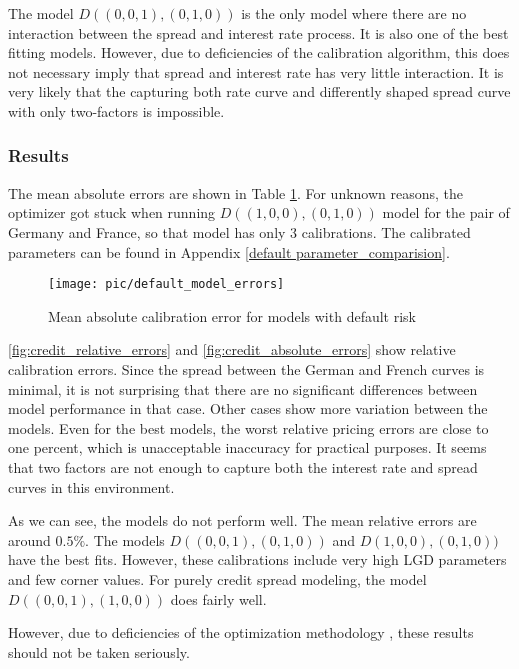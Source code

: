 The model $D((0, 0, 1), (0,1,0))$ is the only model where there are no interaction between the spread and interest rate process. It is also one of the best fitting models. However, due to deficiencies of the calibration algorithm, this does not necessary imply that spread and interest rate has very little interaction. It is very likely that the capturing both rate curve and differently shaped spread curve with only two-factors is impossible.

\subsubsection{Results}

The mean absolute errors are shown in Table \ref{fig:default_model_errors}. For unknown reasons, the optimizer got stuck when running $D((1, 0, 0), (0,1,0))$ model for the pair of Germany and France, so that model has only 3 calibrations. The calibrated parameters can be found in Appendix \ref{default parameter_comparision}.

\begin{figure}[H]
	\centering
	\texttt{[image: pic/default\_model\_errors]}
	\caption{Mean absolute calibration error for models with default risk}
	\label{fig:default_model_errors}
\end{figure}

 \ref{fig:credit_relative_errors} and \ref{fig:credit_absolute_errors} show relative calibration errors. Since the spread between the German and French curves is minimal, it is not surprising that there are no significant differences between model performance in that case. Other cases show more variation between the models. Even for the best models, the worst relative pricing errors are close to one percent, which is unacceptable inaccuracy for practical purposes. It seems that two factors are not enough to capture both the interest rate and spread curves in this environment.

As we can see, the models do not perform well. The mean relative errors are around $0.5 \%$. The models $D((0,0,1), (0, 1, 0))$ and $D(1,0,0), (0, 1, 0))$ have the best fits. However, these calibrations include very high LGD parameters and few corner values. For purely credit spread modeling, the model $D((0,0,1),(1,0,0))$ does fairly well. 


However, due to deficiencies of the optimization methodology , these results should not be taken seriously.

